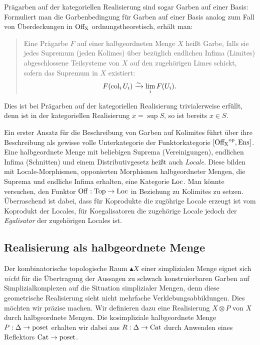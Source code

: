 \begin{bem}
  Prägarben auf der kategoriellen Realisierung sind sogar Garben auf
  einer Basis: Formuliert man die Garbenbedingung für Garben auf einer
  Basis analog zum Fall von Überdeckungen in $\operatorname{Off_X}$
  ordnungstheoretisch, erhält man:
  \begin{quote}
    Eine Prägarbe $F$ auf einer halbgeordneten Menge $X$ heißt Garbe,
    falls sie jedes Supremum (jeden Kolimes) über bezüglich endlichen
    Infima (Limites) abgeschlossene Teilsysteme von $X$ auf den
    zugehörigen Limes schickt, sofern das Supremum in $X$ existiert:
    \[ F(\operatorname{col}_i U_i) \xrightarrow[]{\sim} \lim_i F(U_i). \]
  \end{quote}
  Dies ist bei Prägarben auf der kategoriellen Realisierung
  trivialerweise erfüllt, denn ist in der kategoriellen Realisierung
  $x = \sup S$, so ist bereits $x \in S$.
\end{bem}

\begin{bem}
  Ein erster Ansatz für die Beschreibung von Garben auf Kolimites
  führt über ihre Beschreibung als gewisse volle Unterkategorie der
  Funktorkategorie $[\operatorname{Off_X}^\mathrm{op}, \operatorname{Ens}]$. Eine halbgeordnete Menge mit
  beliebigen Suprema (Vereinigungen), endlichen Infima (Schnitten) und
  einem Distributivgesetz heißt auch \emph{Locale}. Diese bilden mit
  Locale-Morphismen, opponierten Morphismen halbgeordneter Mengen, die
  Suprema und endliche Infima erhalten, eine Kategorie $\operatorname{Loc}$. Man
  könnte versuchen, den Funktor $\operatorname{Off}: \operatorname{Top} \to \operatorname{Loc}$ in Beziehung zu
  Kolimites zu setzen. Überraschend ist dabei, dass für Koprodukte die
  zugöhrige Locale erzeugt ist vom Koprodukt der Locales, für
  Koegalisatoren die zugehörige Locale jedoch der \emph{Egalisator}
  der zugehörigen Locales ist.
\end{bem}

\subsection{Realisierung als halbgeordnete Menge}
\label{sec:real-poset}

Der kombinatorische topologische Raum $\blacktriangle X$ einer
simplizialen Menge eignet sich \emph{nicht} für die Übertragung der
Aussagen zu schwach konstruierbaren Garben auf Simplizialkomplexen auf
die Situation simplizialer Mengen, denn diese geometrische
Realisierung sieht nicht mehrfache Verklebungsabbildungen. Dies
möchten wir präzise machen. Wir definieren dazu eine Realisierung $X
\otimes P$ von $X$ durch halbgeordnete Mengen. Die kosimpliziale
halbgeordnete Menge $P: \Delta \to \operatorname{poset}$ erhalten wir dabei aus $R:
\Delta \to \operatorname{Cat}$ durch Anwenden eines Reflektors $\operatorname{Cat} \to \operatorname{poset}$.

